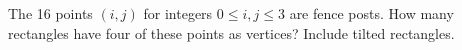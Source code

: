 The 16 points $(i,j)$ for integers $0\le i,j\le3$ are fence posts. How many rectangles have four of these points as vertices? Include tilted rectangles.
